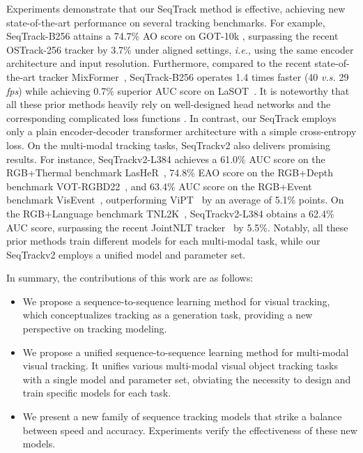 Experiments demonstrate that our SeqTrack method is effective, achieving new state-of-the-art performance on several tracking benchmarks. For example, SeqTrack-B256 attains a 74.7\% AO score on GOT-10k \cite{GOT10K}, surpassing the recent OSTrack-256 tracker \cite{ostrack} by 3.7\% under aligned settings, \emph{i.e.}, using the same encoder architecture and input resolution.
Furthermore, compared to the recent state-of-the-art tracker MixFormer~\cite{mixformer}, SeqTrack-B256 operates 1.4 times faster (40 \emph{v.s.} 29 \emph{fps}) while achieving 0.7\% superior AUC score on LaSOT~\cite{LaSOT}. 
It is noteworthy that all these prior methods heavily rely on well-designed head networks and the corresponding complicated loss functions \cite{GIoU,focal_loss}. In contrast, our SeqTrack employs only a plain encoder-decoder transformer architecture with a simple cross-entropy loss.
On the multi-modal tracking tasks, SeqTrackv2 also delivers promising results. For instance, SeqTrackv2-L384 achieves a 61.0\% AUC score on the RGB+Thermal benchmark LasHeR~\cite{lasher},  74.8\% EAO score on the RGB+Depth benchmark VOT-RGBD22~\cite{vot2022}, and 63.4\% AUC score on the RGB+Event benchmark VisEvent~\cite{visevent}, outperforming ViPT~\cite{vipt} by an average of 5.1\% points. On the RGB+Language benchmark TNL2K~\cite{TNL2K}, SeqTrackv2-L384 obtains a 62.4\% AUC score, surpassing the recent JointNLT tracker~\cite{JointNLT} by 5.5\%. Notably, all these prior methods train different models for each multi-modal task, while our SeqTrackv2 employs a unified model and parameter set.

In summary, the contributions of this work are as follows:
\begin{itemize}[leftmargin=0.468cm]
\vspace{-1mm}
    \item{We propose a sequence-to-sequence learning method for visual tracking, which conceptualizes tracking as a generation task, providing a new perspective on tracking modeling.}
    \item{We propose a unified sequence-to-sequence learning method for multi-modal visual tracking. It unifies various multi-modal visual object tracking tasks with a single model and parameter set, obviating the necessity to design and train specific models for each task.}
    \item{We present a new family of sequence tracking models that strike a balance between speed and accuracy. Experiments verify the effectiveness of these new models.}
\end{itemize}


